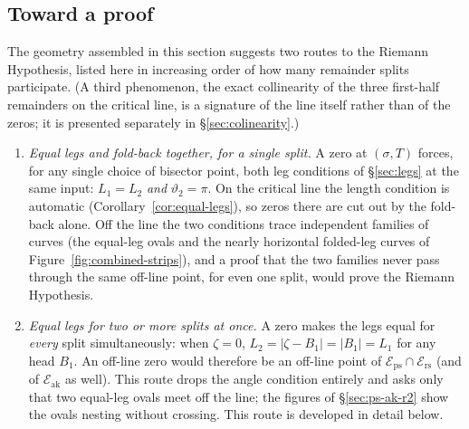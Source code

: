 \documentclass[11pt]{article}
\theoremstyle{definition}
\begin{document}
\subsection{Toward a proof}\label{sec:toward-proof}

The geometry assembled in this section suggests two routes to the Riemann
Hypothesis, listed here in increasing order of how many remainder splits
participate. (A third phenomenon, the exact collinearity of the three
first-half remainders on the critical line, is a signature of the line
itself rather than of the zeros; it is presented separately in
\S\ref{sec:colinearity}.)

\begin{enumerate}
\item \emph{Equal legs and fold-back together, for a single split.}
A zero at $(\sigma,T)$ forces, for any single choice of bisector point, both
leg conditions of \S\ref{sec:legs} at the same input: $L_1=L_2$ \emph{and}
$\vartheta_2=\pi$. On the critical line the length condition is automatic
(Corollary~\ref{cor:equal-legs}), so zeros there are cut out by the fold-back
alone. Off the line the two conditions trace independent families of curves
(the equal-leg ovals and the nearly horizontal folded-leg curves of
Figure~\ref{fig:combined-strips}), and a proof that the two families never
pass through the same off-line point, for even one split, would prove the
Riemann Hypothesis.

\item \emph{Equal legs for two or more splits at once.}
A zero makes the legs equal for \emph{every} split simultaneously: when
$\zeta=0$, $L_2=|\zeta-B_1|=|B_1|=L_1$ for any head $B_1$. An off-line zero
would therefore be an off-line point of
$\mathcal{E}_{\mathrm{ps}}\cap\mathcal{E}_{\mathrm{rs}}$ (and of
$\mathcal{E}_{\mathrm{ak}}$ as well). This route drops the angle condition
entirely and asks only that two equal-leg ovals meet off the line; the
figures of \S\ref{sec:ps-ak-r2} show the ovals nesting without crossing.
This route is developed in detail below.
\end{enumerate}
\end{document}
